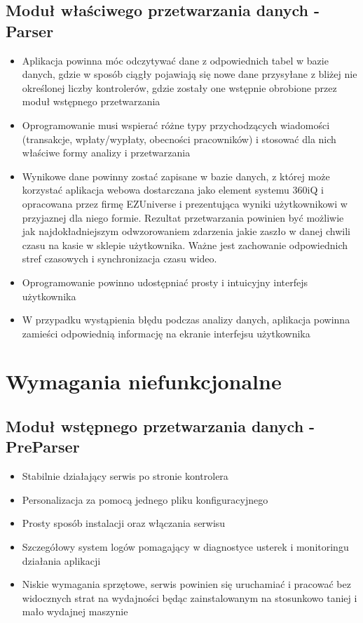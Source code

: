 \documentclass[a4paper]{book}
\begin{document}
\subsection{Moduł właściwego przetwarzania danych - Parser}
\begin{itemize}
	\item Aplikacja powinna móc odczytywać dane z odpowiednich tabel w bazie danych, gdzie w sposób ciągły pojawiają się nowe dane przysyłane z bliżej nie określonej liczby kontrolerów, gdzie zostały one wstępnie obrobione przez moduł wstępnego przetwarzania
	\item Oprogramowanie musi wspierać różne typy przychodzących wiadomości (transakcje, wpłaty/wypłaty, obecności pracowników) i stosować dla nich właściwe formy analizy i przetwarzania
	\item Wynikowe dane powinny zostać zapisane w bazie danych, z której może korzystać aplikacja webowa dostarczana jako element systemu 360iQ i opracowana przez firmę EZUniverse i prezentująca wyniki użytkownikowi w przyjaznej dla niego formie. Rezultat przetwarzania powinien być możliwie jak najdokładniejszym odwzorowaniem zdarzenia jakie zaszło w danej chwili czasu na kasie w sklepie użytkownika. Ważne jest zachowanie odpowiednich stref czasowych i synchronizacja czasu wideo.
	\item Oprogramowanie powinno udostępniać prosty i intuicyjny interfejs użytkownika
	\item W przypadku wystąpienia błędu podczas analizy danych, aplikacja powinna zamieści odpowiednią informację na ekranie interfejsu użytkownika
\end{itemize}
\section{Wymagania niefunkcjonalne}
\subsection{Moduł wstępnego przetwarzania danych - PreParser}
\begin{itemize}
	\item Stabilnie działający serwis po stronie kontrolera
	\item Personalizacja za pomocą jednego pliku konfiguracyjnego
	\item Prosty sposób instalacji oraz włączania serwisu
	\item Szczegółowy system logów pomagający w diagnostyce usterek i monitoringu działania aplikacji
	\item Niskie wymagania sprzętowe, serwis powinien się uruchamiać i pracować bez widocznych strat na wydajności będąc zainstalowanym na stosunkowo taniej i mało wydajnej maszynie
\end{itemize}
\end{document}

